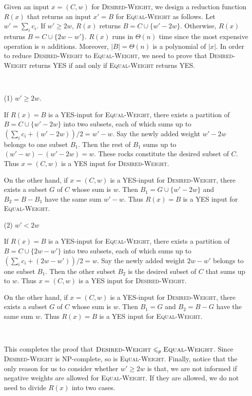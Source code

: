 \documentclass{article}
\begin{document}
Given an input $x=(C,w)$ for \textsc{Desired-Weight}, we design a reduction function $R(x)$ that returns an input $x'=B$ for \textsc{Equal-Weight} as follows. Let $w'=\sum_ic_i$. If $w'\geqslant2w$, $R(x)$ returns $B=C\cup\{w'-2w\}$. Otherwise, $R(x)$ returns $B=C\cup\{2w-w'\}$. $R(x)$ runs in $\Theta(n)$ time since the most expensive operation is $n$ additions. Moreover, $|B|=\Theta(n)$ is a polynomial of $|x|$. In order to reduce \textsc{Desired-Weight} to \textsc{Equal-Weight}, we need to prove that \textsc{Desired-Weight} returns YES if and only if \textsc{Equal-Weight} returns YES.

~

\noindent(1) $w'\geqslant2w$.

If $R(x)=B$ is a YES-input for \textsc{Equal-Weight}, there exists a partition of $B=C\cup\{w'-2w\}$ into two subsets, each of which sums up to $(\sum_ic_i+(w'-2w))/2=w'-w$. Say the newly added weight $w'-2w$ belongs to one subset $B_1$. Then the rest of $B_1$ sums up to $(w'-w)-(w'-2w)=w$. These rocks constitute the desired subset of $C$. Thus $x=(C,w)$ is a YES input for \textsc{Desired-Weight}.

On the other hand, if $x=(C,w)$ is a YES-input for \textsc{Desired-Weight}, there exists a subset $G$ of $C$ whose sum is $w$. Then $B_1=G\cup\{w'-2w\}$ and $B_2=B-B_1$ have the same sum $w'-w$. Thus $R(x)=B$ is a YES input for \textsc{Equal-Weight}.

\noindent(2) $w'<2w$

If $R(x)=B$ is a YES-input for \textsc{Equal-Weight}, there exists a partition of $B=C\cup\{2w-w'\}$ into two subsets, each of which sums up to $(\sum_ic_i+(2w-w'))/2=w$. Say the newly added weight $2w-w'$ belongs to one subset $B_1$. Then the other subset $B_2$ is the desired subset of $C$ that sums up to $w$. Thus $x=(C,w)$ is a YES input for \textsc{Desired-Weight}.

On the other hand, if $x=(C,w)$ is a YES-input for \textsc{Desired-Weight}, there exists a subset $G$ of $C$ whose sum is $w$. Then $B_1=G$ and $B_2=B-G$ have the same sum $w$. Thus $R(x)=B$ is a YES input for \textsc{Equal-Weight}.

~

This completes the proof that $\textsc{Desired-Weight}\leqslant_p\textsc{Equal-Weight}$. Since \textsc{Desired-Weight} is NP-complete, so is \textsc{Equal-Weight}. Finally, notice that the only reason for us to consider whether $w'\geqslant2w$ is that, we are not informed if negative weights are allowed for \textsc{Equal-Weight}. If they are allowed, we do not need to divide $R(x)$ into two cases.
\end{document}

